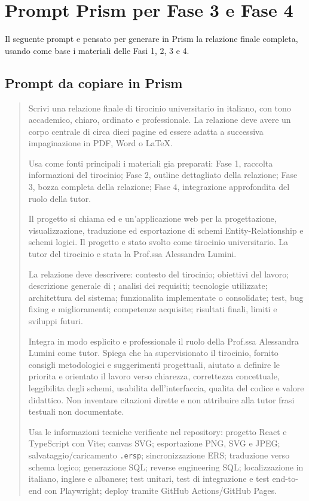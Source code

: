 
\chapter{Prompt Prism per Fase 3 e Fase 4}

Il seguente prompt e pensato per generare in Prism la relazione finale completa, usando come base i materiali delle Fasi 1, 2, 3 e 4.

\section{Prompt da copiare in Prism}

\begin{quote}\small
Scrivi una relazione finale di tirocinio universitario in italiano, con tono accademico, chiaro, ordinato e professionale. La relazione deve avere un corpo centrale di circa dieci pagine ed essere adatta a successiva impaginazione in PDF, Word o LaTeX.

Usa come fonti principali i materiali gia preparati: Fase 1, raccolta informazioni del tirocinio; Fase 2, outline dettagliato della relazione; Fase 3, bozza completa della relazione; Fase 4, integrazione approfondita del ruolo della tutor.

Il progetto si chiama \builder{} ed e un'applicazione web per la progettazione, visualizzazione, traduzione ed esportazione di schemi Entity-Relationship e schemi logici. Il progetto e stato svolto come tirocinio universitario. La tutor del tirocinio e stata la Prof.ssa Alessandra Lumini.

La relazione deve descrivere: contesto del tirocinio; obiettivi del lavoro; descrizione generale di \builder; analisi dei requisiti; tecnologie utilizzate; architettura del sistema; funzionalita implementate o consolidate; test, bug fixing e miglioramenti; competenze acquisite; risultati finali, limiti e sviluppi futuri.

Integra in modo esplicito e professionale il ruolo della Prof.ssa Alessandra Lumini come tutor. Spiega che ha supervisionato il tirocinio, fornito consigli metodologici e suggerimenti progettuali, aiutato a definire le priorita e orientato il lavoro verso chiarezza, correttezza concettuale, leggibilita degli schemi, usabilita dell'interfaccia, qualita del codice e valore didattico. Non inventare citazioni dirette e non attribuire alla tutor frasi testuali non documentate.

Usa le informazioni tecniche verificate nel repository: progetto React e TypeScript con Vite; canvas SVG; esportazione PNG, SVG e JPEG; salvataggio/caricamento \texttt{.ersp}; sincronizzazione ERS; traduzione verso schema logico; generazione SQL; reverse engineering SQL; localizzazione in italiano, inglese e albanese; test unitari, test di integrazione e test end-to-end con Playwright; deploy tramite GitHub Actions/GitHub Pages.


\end{quote}
